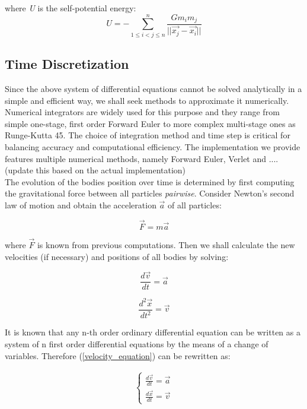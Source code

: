 \documentclass{article}
\begin{document}
\noindent where \textit{U} is the self-potential energy:
$$ U = - \sum_{1 \leq i < j \leq n}^{n} \frac{Gm_i m_j}{||\vec{x_j} - \vec{x_i}||}$$ 

\subsection{Time Discretization}

Since the above system of differential equations cannot be solved analytically in a simple and efficient way, we shall seek methods to approximate it numerically. Numerical integrators are widely used for this purpose and they range from simple one-stage, first order Forward Euler to more complex multi-stage ones as Runge-Kutta 45. The choice of integration method and time step is critical for balancing accuracy and computational efficiency.
The implementation we provide features multiple numerical methods, namely Forward Euler, Verlet and .... (update this based on the actual implementation) \\
The evolution of the bodies position over time is determined by first computing the gravitational force between all particles \textit{pairwise}. Consider Newton's second law of motion and obtain the acceleration $\vec{a}$ of all particles: 

$$ \Vec{F} = m \vec{a} $$

\noindent where $\Vec{F}$ is known from previous computations. Then we shall calculate the new velocities (if necessary) and positions of all bodies by solving:

\begin{equation}
\label{velocity_equation}
\frac{d\Vec{v}}{dt} = \Vec{a}    
\end{equation}

\begin{equation}
\label{position_equation}
\frac{d^2\Vec{x}}{dt^2} = \Vec{v}   
\end{equation}

\noindent It is known that any n-th order ordinary differential equation can be written as a system of n first order differential equations by the means of a change of variables. Therefore (\ref{velocity_equation}) can be rewritten as: \cite{crash-course-astro}

\begin{gather*}
  \begin{cases}
    \displaystyle\frac{d\Vec{v}}{dt} = \Vec{a} \\[1ex]
    \displaystyle\frac{d\Vec{x}}{dt} = \Vec{v}
  \end{cases}
\end{gather*}
\end{document}
